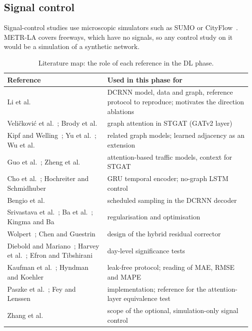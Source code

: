 \documentclass[11pt,a4paper]{article}
\begin{document}
\subsection{Signal control}
Signal-control studies use microscopic simulators such as SUMO or CityFlow~\citep{zhang2019cityflow}. METR-LA covers
freeways, which have no signals, so any control study on it would be a simulation of a synthetic network.

\begin{table}[htbp]
\centering
\caption{Literature map: the role of each reference in the DL phase.}
\label{tab:litmap}
\small
\begin{tabularx}{\linewidth}{@{}p{4.3cm}X@{}}
\toprule
Reference & Used in this phase for \\
\midrule
Li et al.~\citep{li2018dcrnn} & DCRNN model, data and graph, reference protocol to reproduce; motivates the direction ablations \\
Veli\v{c}kovi\'c et al.~\citep{velickovic2018gat}; Brody et al.~\citep{brody2022gatv2} & graph attention in STGAT (GATv2 layer) \\
Kipf and Welling~\citep{kipf2017gcn}; Yu et al.~\citep{yu2018stgcn}; Wu et al.~\citep{wu2019graphwavenet} & related graph models; learned adjacency as an extension \\
Guo et al.~\citep{guo2019astgcn}; Zheng et al.~\citep{zheng2020gman} & attention-based traffic models, context for STGAT \\
Cho et al.~\citep{cho2014gru}; Hochreiter and Schmidhuber~\citep{hochreiter1997lstm} & GRU temporal encoder; no-graph LSTM control \\
Bengio et al.~\citep{bengio2015scheduled} & scheduled sampling in the DCRNN decoder \\
Srivastava et al.~\citep{srivastava2014dropout}; Ba et al.~\citep{ba2016layernorm}; Kingma and Ba~\citep{kingma2015adam} & regularisation and optimisation \\
Wolpert~\citep{wolpert1992stacking}; Chen and Guestrin~\citep{chen2016xgboost} & design of the hybrid residual corrector \\
Diebold and Mariano~\citep{diebold1995dm}; Harvey et al.~\citep{harvey1997hln}; Efron and Tibshirani~\citep{efron1993bootstrap} & day-level significance tests \\
Kaufman et al.~\citep{kaufman2012leakage}; Hyndman and Koehler~\citep{hyndman2006measures} & leak-free protocol; reading of MAE, RMSE and MAPE \\
Paszke et al.~\citep{paszke2019pytorch}; Fey and Lenssen~\citep{fey2019pyg} & implementation; reference for the attention-layer equivalence test \\
Zhang et al.~\citep{zhang2019cityflow} & scope of the optional, simulation-only signal control \\
\bottomrule
\end{tabularx}
\end{table}
\end{document}
